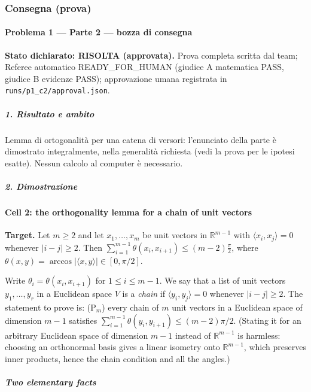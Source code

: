\documentclass[11pt,a4paper]{article}
\begin{document}
\subsubsection{Consegna (prova)}
\paragraph{Problema 1 --- Parte 2 --- bozza di
consegna}\label{problema-1-parte-2-bozza-di-consegna}

\textbf{Stato dichiarato: RISOLTA (approvata).} Prova completa scritta
dal team; Referee automatico READY\_FOR\_HUMAN (giudice A matematica
PASS, giudice B evidenze PASS); approvazione umana registrata in
\texttt{runs/p1\_c2/approval.json}.

\subparagraph{1. Risultato e ambito}\label{risultato-e-ambito}

Lemma di ortogonalità per una catena di versori: l'enunciato della parte
è dimostrato integralmente, nella generalità richiesta (vedi la prova
per le ipotesi esatte). Nessun calcolo al computer è necessario.

\subparagraph{2. Dimostrazione}\label{dimostrazione}

\paragraph{Cell 2: the orthogonality lemma for a chain of unit
vectors}\label{cell-2-the-orthogonality-lemma-for-a-chain-of-unit-vectors}

\textbf{Target.} Let \(m\ge2\) and let \(x_1,\dots,x_m\) be unit vectors
in \(\mathbb R^{m-1}\) with \(\langle x_i,x_j\rangle=0\) whenever
\(|i-j|\ge2\). Then
\(\sum_{i=1}^{m-1}\theta(x_i,x_{i+1})\le(m-2)\frac{\pi}{2}\), where
\(\theta(x,y)=\arccos|\langle x,y\rangle|\in[0,\pi/2]\).

Write \(\theta_i=\theta(x_i,x_{i+1})\) for \(1\le i\le m-1\). We say
that a list of unit vectors \(y_1,\dots,y_r\) in a Euclidean space \(V\)
is a \emph{chain} if \(\langle y_i,y_j\rangle=0\) whenever
\(|i-j|\ge2\). The statement to prove is: (P\(_m\)) every chain of \(m\)
unit vectors in a Euclidean space of dimension \(m-1\) satisfies
\(\sum_{i=1}^{m-1}\theta(y_i,y_{i+1})\le(m-2)\pi/2\). (Stating it for an
arbitrary Euclidean space of dimension \(m-1\) instead of
\(\mathbb R^{m-1}\) is harmless: choosing an orthonormal basis gives a
linear isometry onto \(\mathbb R^{m-1}\), which preserves inner
products, hence the chain condition and all the angles.)

\subparagraph{Two elementary facts}\label{two-elementary-facts}
\end{document}
